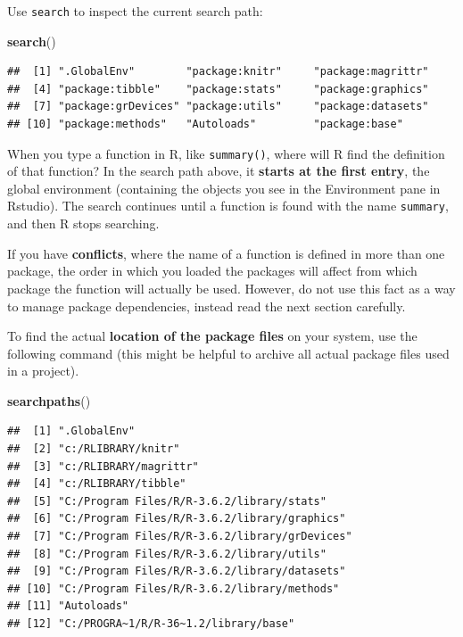 \documentclass[]{book}
\newenvironment{Shaded}{\begin{snugshade}}{\end{snugshade}}
\newcommand{\KeywordTok}[1]{\textcolor[rgb]{0.13,0.29,0.53}{\textbf{#1}}}
\newcommand{\NormalTok}[1]{#1}
\begin{document}
Use \texttt{search} to inspect the current search path:

\begin{Shaded}
\begin{Highlighting}[]
\KeywordTok{search}\NormalTok{()}
\end{Highlighting}
\end{Shaded}

\begin{verbatim}
##  [1] ".GlobalEnv"        "package:knitr"     "package:magrittr" 
##  [4] "package:tibble"    "package:stats"     "package:graphics" 
##  [7] "package:grDevices" "package:utils"     "package:datasets" 
## [10] "package:methods"   "Autoloads"         "package:base"
\end{verbatim}

When you type a function in R, like \texttt{summary()}, where will R find the definition of that function? In the search path above, it \textbf{starts at the first entry}, the global environment (containing the objects you see in the Environment pane in Rstudio). The search continues until a function is found with the name \texttt{summary}, and then R stops searching.

If you have \textbf{conflicts}, where the name of a function is defined in more than one package, the order in which you loaded the packages will affect from which package the function will actually be used. However, do not use this fact as a way to manage package dependencies, instead read the next section carefully.

To find the actual \textbf{location of the package files} on your system, use the following command (this might be helpful to archive all actual package files used in a project).

\begin{Shaded}
\begin{Highlighting}[]
\KeywordTok{searchpaths}\NormalTok{()}
\end{Highlighting}
\end{Shaded}

\begin{verbatim}
##  [1] ".GlobalEnv"                                  
##  [2] "c:/RLIBRARY/knitr"                           
##  [3] "c:/RLIBRARY/magrittr"                        
##  [4] "c:/RLIBRARY/tibble"                          
##  [5] "C:/Program Files/R/R-3.6.2/library/stats"    
##  [6] "C:/Program Files/R/R-3.6.2/library/graphics" 
##  [7] "C:/Program Files/R/R-3.6.2/library/grDevices"
##  [8] "C:/Program Files/R/R-3.6.2/library/utils"    
##  [9] "C:/Program Files/R/R-3.6.2/library/datasets" 
## [10] "C:/Program Files/R/R-3.6.2/library/methods"  
## [11] "Autoloads"                                   
## [12] "C:/PROGRA~1/R/R-36~1.2/library/base"
\end{verbatim}
\end{document}
